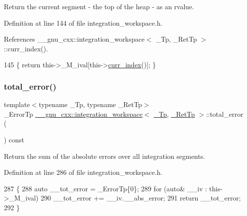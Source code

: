 Return the current segment -\/ the top of the heap -\/ as an rvalue. 

Definition at line 144 of file integration\+\_\+workspace.\+h.



References \+\_\+\+\_\+gnu\+\_\+cxx\+::integration\+\_\+workspace$<$ \+\_\+\+Tp, \+\_\+\+Ret\+Tp $>$\+::curr\+\_\+index().


\begin{DoxyCode}
145       \{ \textcolor{keywordflow}{return} this->\_M\_ival[this->\hyperlink{class____gnu__cxx_1_1integration__workspace_a51a384b1777615943add69f1895454f5}{curr\_index}()]; \}
\end{DoxyCode}
\mbox{\label{class____gnu__cxx_1_1integration__workspace_af321cc49c560b2a78dff70c350db020c}} 
\subsubsection{\texorpdfstring{total\+\_\+error()}{total\_error()}}
{\footnotesize\ttfamily template$<$typename \+\_\+\+Tp, typename \+\_\+\+Ret\+Tp$>$ \\
\+\_\+\+Error\+Tp \hyperlink{class____gnu__cxx_1_1integration__workspace}{\+\_\+\+\_\+gnu\+\_\+cxx\+::integration\+\_\+workspace}$<$ \hyperlink{namespace____gnu__cxx_a3b19a9c800ca194374ef9172290f7d79}{\+\_\+\+Tp}, \hyperlink{namespace____gnu__cxx_a886e03ece3d53ff7fa6c098a40f93fa5}{\+\_\+\+Ret\+Tp} $>$\+::total\+\_\+error (\begin{DoxyParamCaption}{ }\end{DoxyParamCaption}) const\hspace{0.3cm}{\ttfamily [inline]}}



Return the sum of the absolute errors over all integration segments. 



Definition at line 286 of file integration\+\_\+workspace.\+h.


\begin{DoxyCode}
287       \{
288         \textcolor{keyword}{auto} \_\_tot\_error = \_ErrorTp\{0\};
289         \textcolor{keywordflow}{for} (\textcolor{keyword}{auto}& \_\_iv : this->\_M\_ival)
290           \_\_tot\_error += \_\_iv.\_\_abs\_error;
291         \textcolor{keywordflow}{return} \_\_tot\_error;
292       \}
\end{DoxyCode}
\mbox{\label{class____gnu__cxx_1_1integration__workspace_a8453bc74f14f20a4ceab0b735718bbae}} 
